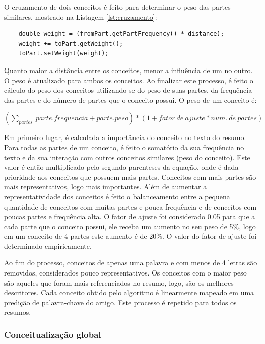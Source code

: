 O cruzamento de dois conceitos é feito para determinar o peso das partes similares, mostrado na Listagem \ref{lst:cruzamento}:
\begin{lstlisting}
    double weight = (fromPart.getPartFrequency() * distance);
    weight += toPart.getWeight();
    toPart.setWeight(weight);
\end{lstlisting}

Quanto maior a distância entre os conceitos, menor a influência de um no outro. O peso é atualizado para ambos os conceitos. Ao finalizar este processo, é feito o cálculo do peso dos conceitos utilizando-se do peso de suas partes, da frequência das partes e do número de partes que o conceito possui. O peso de um conceito é:

\(
\left(\sum_{partes}\medspace parte.frequencia + parte.peso\right) * \left(1 + fator\medspace de\medspace ajuste * num.\medspace de\medspace partes\right)
\)

Em primeiro lugar, é calculada a importância do conceito no texto do resumo. Para todas as partes de um conceito, é feito o somatório da sua frequência no texto e da sua interação com outros conceitos similares (peso do conceito). Este valor é então multiplicado pelo segundo parenteses da equação, onde é dada prioridade aos conceitos que possuem mais partes. Conceitos com mais partes são mais representativos, logo mais importantes. Além de aumentar a representatividade dos conceitos é feito o balanceamento entre a pequena quantidade de conceitos com muitas partes e pouca frequência e de conceitos com poucas partes e frequência alta. O fator de ajuste foi considerado 0.05 para que a cada parte que o conceito possui, ele receba um aumento no seu peso de 5\%, logo em um conceito de 4 partes este aumento é de 20\%. O valor do fator de ajuste foi determinado empiricamente.

Ao fim do processo, conceitos de apenas uma palavra e com menos de 4 letras são removidos, considerados pouco representativos.
Os conceitos com o maior peso são aqueles que foram mais referenciados no resumo, logo, são os melhores descritores. Cada conceito obtido pelo algoritmo é linearmente mapeado em uma predição de palavra-chave do artigo. Este processo é repetido para todos os resumos.

\subsubsection{Conceitualização global}

